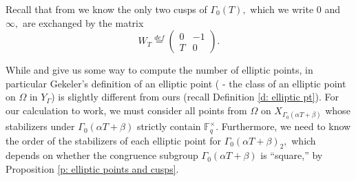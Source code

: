\documentclass[11pt]{amsart}
\theoremstyle{definition}
\numberwithin{equation}{section}
\newcommand{\bbF}{\mathbb{F}}		%
\begin{document}
Recall that from \cite[Section $4$]{Dalal-Kumar-Gamma_0(T)-structure} we know the only two cusps of $\Gamma_0(T),$ which we write $0$ and $\infty,$ are exchanged by the matrix 
\[W_T\overset{def}{=}\left(\begin{array}{cc}0&-1\\T&0\end{array}\right).\]

While \cite[Proposition $7.2$]{Gekeler-Invariants} and \cite[Proposition $7.3$]{Gekeler-Invariants} give us some way to compute the number of elliptic points, in particular Gekeler's definition of an elliptic point (\cite[$(3.2)$]{Gekeler-Invariants} - the class of an elliptic point on $\Omega$ in $Y_{\Gamma}$) is slightly different from ours (recall Definition \ref{d: elliptic pt}). For our calculation to work, we must consider all points from $\Omega$ on %
$X_{\Gamma_0(\alpha T+\beta)}$ whose stabilizers under 
$\Gamma_0(\alpha T+\beta)$ 
strictly contain $\bbF_q^{\times}.$ Furthermore, we need to know the order of the stabilizers of each elliptic point for %
$\Gamma_0(\alpha T+\beta)_2,$ which depends on whether the congruence subgroup %
$\Gamma_0(\alpha T+\beta)$ is ``square,'' by Proposition \ref{p: elliptic points and cusps}.\\
\end{document}
